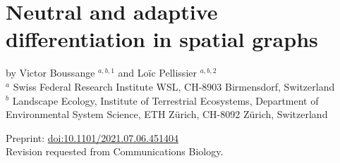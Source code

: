 %
\graphicspath{{./content/part_I/diff_in_graphs/figures/}}

\chapter{Neutral and adaptive differentiation in spatial graphs}
\label{sec:diff-in-graphs}

by Victor Boussange $^{a,b,1}$ and Loïc Pellissier $^{a,b,2}$\bigskip\\

$^a$ \small{Swiss Federal Research Institute WSL, CH-8903 Birmensdorf, Switzerland}\smallskip\\
$^b$ \small{Landscape Ecology, Institute of Terrestrial Ecosystems, Department of Environmental System Science, ETH Zürich, CH-8092 Zürich, Switzerland}\smallskip\\

\begin{center}
  Preprint: \href{https://doi.org/10.1101/2021.07.06.451404}{doi:10.1101/2021.07.06.451404}\\
  Revision requested from Communications Biology.
\end{center}

